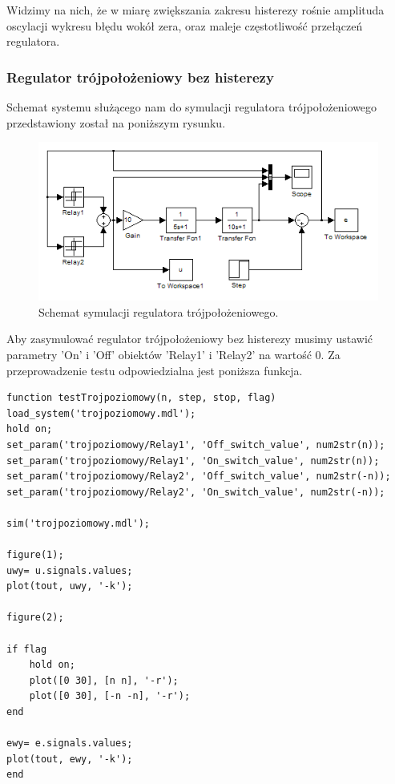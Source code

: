 \documentclass[a4paper,10pt]{article}
\begin{document}
\newpage Widzimy na nich, że w miarę zwiększania zakresu histerezy rośnie amplituda oscylacji wykresu błędu wokół zera, oraz maleje częstotliwość przełączeń regulatora.

\subsubsection{Regulator trójpołożeniowy bez histerezy}\label{sec:r3bh}

\normalsize Schemat systemu służącego nam do symulacji regulatora trójpołożeniowego przedstawiony został na poniższym rysunku.

\begin{figure}[!h]
    \centering
	\includegraphics[width=120mm]{CW3-schemat-3.png}
	\caption{Schemat symulacji regulatora trójpołożeniowego.}
    \label{fig:Rysunek}
\end{figure}

Aby zasymulować regulator trójpołożeniowy bez histerezy musimy ustawić parametry 'On' i 'Off' obiektów 'Relay1' i 'Relay2' na wartość 0.
\newpage Za przeprowadzenie testu odpowiedzialna jest poniższa funkcja.

\begin{lstlisting}[caption=Funkcja testująca regulator trójpołożeniowy bez histerezy.]
function testTrojpoziomowy(n, step, stop, flag)
load_system('trojpoziomowy.mdl');
hold on;
set_param('trojpoziomowy/Relay1', 'Off_switch_value', num2str(n));
set_param('trojpoziomowy/Relay1', 'On_switch_value', num2str(n));
set_param('trojpoziomowy/Relay2', 'Off_switch_value', num2str(-n));
set_param('trojpoziomowy/Relay2', 'On_switch_value', num2str(-n));

sim('trojpoziomowy.mdl');

figure(1);
uwy= u.signals.values;    
plot(tout, uwy, '-k');

figure(2);

if flag
    hold on;
    plot([0 30], [n n], '-r');
    plot([0 30], [-n -n], '-r');
end

ewy= e.signals.values;    
plot(tout, ewy, '-k');
end
\end{lstlisting}
\end{document}
